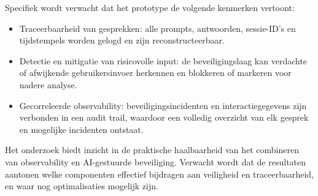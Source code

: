 \noindent Specifiek wordt verwacht dat het prototype de volgende kenmerken vertoont:
\begin{itemize}
\item Traceerbaarheid van gesprekken: alle prompts, antwoorden, sessie-ID’s en tijdstempels worden gelogd en zijn reconstructeerbaar.

\item Detectie en mitigatie van risicovolle input: de beveiligingslaag kan verdachte of afwijkende gebruikersinvoer herkennen en blokkeren of markeren voor nadere analyse.

\item Gecorreleerde observability: beveiligingsincidenten en interactiegegevens zijn verbonden in een audit trail, waardoor een volledig overzicht van elk gesprek en mogelijke incidenten ontstaat.

\end{itemize}

\noindent Het onderzoek biedt inzicht in de praktische haalbaarheid van het combineren van observability en AI-gestuurde beveiliging. Verwacht wordt dat de resultaten aantonen welke componenten effectief bijdragen aan veiligheid en traceerbaarheid, en waar nog optimalisaties mogelijk zijn.

